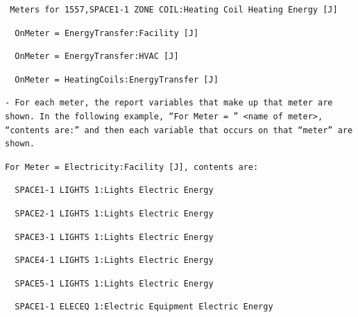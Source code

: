 \begin{lstlisting}
 Meters for 1557,SPACE1-1 ZONE COIL:Heating Coil Heating Energy [J]
\end{lstlisting}

\begin{lstlisting}
  OnMeter = EnergyTransfer:Facility [J]
\end{lstlisting}

\begin{lstlisting}
  OnMeter = EnergyTransfer:HVAC [J]
\end{lstlisting}

\begin{lstlisting}
  OnMeter = HeatingCoils:EnergyTransfer [J]
\end{lstlisting}

\begin{lstlisting}
- For each meter, the report variables that make up that meter are shown. In the following example, “For Meter = ” <name of meter>, “contents are:” and then each variable that occurs on that “meter” are shown.
\end{lstlisting}

\begin{lstlisting}
For Meter = Electricity:Facility [J], contents are:
\end{lstlisting}

\begin{lstlisting}
  SPACE1-1 LIGHTS 1:Lights Electric Energy
\end{lstlisting}

\begin{lstlisting}
  SPACE2-1 LIGHTS 1:Lights Electric Energy
\end{lstlisting}

\begin{lstlisting}
  SPACE3-1 LIGHTS 1:Lights Electric Energy
\end{lstlisting}

\begin{lstlisting}
  SPACE4-1 LIGHTS 1:Lights Electric Energy
\end{lstlisting}

\begin{lstlisting}
  SPACE5-1 LIGHTS 1:Lights Electric Energy
\end{lstlisting}

\begin{lstlisting}
  SPACE1-1 ELECEQ 1:Electric Equipment Electric Energy
\end{lstlisting}


